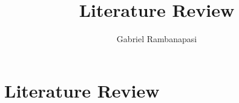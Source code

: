 \documentclass[11pt,preprint, authoryear]{elsarticle}
\numberwithin{equation}{section}
\numberwithin{figure}{section}
\numberwithin{table}{section}
\begin{document}
\begin{frontmatter}  %

\title{Literature Review}





\author[Add1]{Gabriel Rambanapasi}





\address[Add1]{Stellenbosch University, Cape Town, South Africa}



\vspace{1cm}





\vspace{0.5cm}

\end{frontmatter}

\setcounter{footnote}{0}



\pagestyle{fancy}
\chead{}
\rhead{}
\lfoot{}
\lhead{}
\cfoot{}


\headsep 35pt %




\hypertarget{literature-review}{%
\section{\texorpdfstring{Literature Review
\label{Literature Review}}{Literature Review }}\label{literature-review}}
\end{document}
